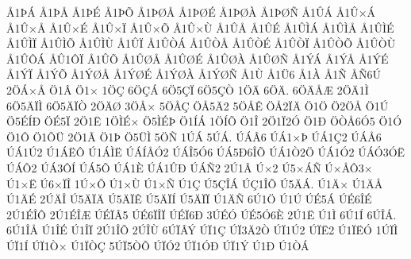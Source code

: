 {^^c51^^de^^c1
^^c51^^de^^c5
^^c51^^de^^c9
^^c51^^de^^d5
^^c51^^de^^d8^^c5
^^c51^^de^^d8^^c9
^^c51^^de^^d8^^c0
^^c51^^de^^d8^^d1
^^c51^^db^^c1
^^c51^^db^^d7^^c1
^^c51^^db^^d7^^c5
^^c51^^db^^d7^^c9
^^c51^^db^^d7^^cf
^^c51^^db^^d7^^d5
^^c51^^db^^d7^^d9
^^c51^^db^^c5
^^c51^^db^^c9
^^c51^^db^^cc^^c1
^^c51^^db^^cc^^c5
^^c51^^db^^cc^^c9
^^c51^^db^^cc^^cf
^^c51^^db^^cc^^d5
^^c51^^db^^cc^^d9
^^c51^^db^^cf
^^c51^^db^^d2^^c1
^^c51^^db^^d2^^c5
^^c51^^db^^d2^^c9
^^c51^^db^^d2^^cf
^^c51^^db^^d2^^d5
^^c51^^db^^d2^^d9
^^c51^^db^^d4^^c1
^^c5^^db1^^d4^^cf
^^c51^^db^^d5
^^c51^^db^^d8^^c5
^^c51^^db^^d8^^c9
^^c51^^db^^d8^^c0
^^c51^^db^^d8^^d1
^^c51^^dd^^c1
^^c51^^dd^^c5
^^c51^^dd^^c9
^^c51^^dd^^cf
^^c51^^dd^^d5
^^c51^^dd^^d8^^c5
^^c51^^dd^^d8^^c9
^^c51^^dd^^d8^^c0
^^c51^^dd^^d8^^d1
^^c51^^d9
^^c51^^dc6
^^c51^^c0
^^c51^^d1
^^c5^^d16^^da
2^^d6^^c1^^d7^^c5
^^d61^^c2
^^d61^^d7
1^^d6^^c7
6^^d6^^c7^^c1
6^^d65^^c7^^cf
6^^d65^^c7^^d2
1^^d6^^c4
6^^d6^^c4.
6^^d6^^c4^^c5^^c6
2^^d6^^c41^^cc
6^^d65^^c4^^cf^^cc
6^^d65^^c4^^cf^^d2
2^^d6^^c4^^d8
3^^d6^^c5^^d7
5^^d6^^c5^^c7
^^d6^^c55^^c42
5^^d6^^c5^^ca
^^d6^^c52^^cf^^c4
^^d61^^d6
^^d62^^d6^^c5
^^d61^^da
^^d65^^c9^^cd^^d0
^^d6^^c95^^cf
2^^d61^^cb
1^^d6^^cc^^c9^^d7
^^d65^^cc^^c9^^de
^^d61^^cd^^c1
1^^d6^^cd^^d5
^^d61^^ce
2^^d61^^cf2^^d3
^^d61^^d0
^^d6^^d2^^c56^^d35
^^d61^^d3
^^d61^^d4
^^d61^^d5^^dc
2^^d61^^c3
^^d61^^de
^^d65^^dc^^cc
5^^d6^^d1
1^^da^^c1
5^^da^^c1.
^^da^^c1^^c26
^^da^^c11^^d7^^de
^^da^^c11^^c72
^^da^^c1^^c56
^^da^^c11^^da2
^^da1^^c1^^cb^^d4
^^da1^^c1^^cc^^cb
^^da^^c1^^cd^^c5^^d32
^^da^^c1^^ce5^^d36
^^da^^c15^^d06^^ce^^d5
^^da^^c11^^d22^^d6
^^da^^c11^^d32
^^da^^c1^^d33^^d3^^cb
^^da^^c1^^d42
^^da^^c13^^d4^^cd
^^da^^c15^^d5
^^da^^c11^^c8
^^da^^c11^^db^^d0
^^da^^c1^^d12
2^^da1^^c2
^^da^^d72
^^da5^^d7^^c1^^d1
^^da^^d7^^c5^^d43^^d7
^^da1^^d7^^cb
^^da6^^d7^^cf^^ce
1^^da^^d7^^d5
^^da1^^d7^^d9
^^da1^^d7^^d1
^^da1^^c7
^^da5^^c7^^ce^^c1
^^da^^c71^^ce^^d5
^^da5^^c4^^c1.
^^da1^^c4^^d7
^^da1^^c4^^c5
^^da1^^c4^^c9
2^^da^^c4^^ce
^^da5^^c4^^cf^^c4
^^da5^^c4^^cf^^ca
^^da5^^c4^^cf^^cd
^^da5^^c4^^cf^^cf
^^da1^^c4^^d1
6^^da1^^d6
^^da1^^da
^^da^^c95^^c1
^^da^^c96^^ce^^c9
2^^da1^^c9^^ce^^d4
2^^da1^^c9^^ce^^c6
^^da^^c9^^cf^^c25
^^da^^c96^^cf^^ce^^cf
^^da^^c9^^cf6^^d0
3^^da^^c9^^d3
^^da^^c95^^d36^^c8
2^^da1^^cb
^^da1^^cc
6^^da1^^cd
6^^da^^ce^^c1.
6^^da1^^ce^^c5
^^da1^^ce^^c9
^^da1^^ce^^cf
2^^da1^^ce^^d5
2^^da^^ce^^d9
6^^da^^cf^^c2^^dd
^^da^^cf1^^c7
^^da^^cf3^^c42^^d2
^^da^^cf1^^da2
^^da^^cf^^cb2
^^da1^^cf^^cb^^d3
1^^da^^cf^^cc
^^da^^cf1^^cd
^^da^^cf1^^d2^^d7
^^da1^^cf^^d2^^c7
5^^da^^cf5^^d2^^d5
^^da^^cf^^d32
^^da^^cf1^^d3^^d0
^^da^^cf1^^dd
^^da1^^d0
^^da1^^d2^^c1
}
